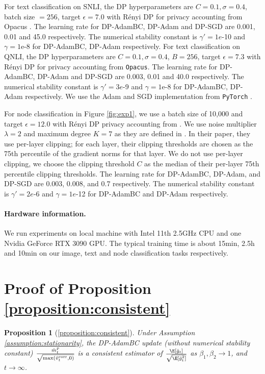 \documentclass[letterpaper]{article} %
\newtheorem*{proposition*}{Proposition}
\begin{document}
For text classification on SNLI, the DP hyperparameters are $C=0.1, \sigma=0.4$, batch size $=256$, target $\epsilon = 7.0$ with R\'enyi DP for privacy accounting from Opacus \citep{opacus}. The learning rate for DP-AdamBC, DP-Adam and DP-SGD are 0.001, 0.01 and 45.0 respectively. The numerical stability constant is $\gamma'=1e$-10 and $\gamma=1$e-8 for DP-AdamBC, DP-Adam respectively. For text classification on QNLI, the DP hyperparameters are $C=0.1, \sigma=0.4$, $B=256$, target $\epsilon = 7.3$ with R\'enyi DP for privacy accounting from \texttt{Opacus}. The learning rate for DP-AdamBC, DP-Adam and DP-SGD are 0.003, 0.01 and 40.0 respectively. The numerical stability constant is $\gamma'=3e$-9 and $\gamma=1$e-8 for DP-AdamBC, DP-Adam respectively. We use the Adam and SGD implementation from \texttt{PyTorch} \citep{pytorch}.

For node classification in Figure \ref{fig:exp1}, we use a batch size of 10,000 and target $\epsilon = 12.0$ with Rényi DP privacy accounting from \citet{daigavane2022nodelevel}. We use noise multiplier $\lambda = 2$ and maximum degree $K = 7$ as they are defined in \citet{daigavane2022nodelevel}. In their paper, they use per-layer clipping; for each layer, their clipping thresholds are chosen as the 75th percentile of the gradient norms for that layer. We do not use per-layer clipping, we choose the clipping threshold $C$ as the median of their per-layer 75th percentile clipping thresholds. The learning rate for DP-AdamBC, DP-Adam, and DP-SGD are 0.003, 0.008, and 0.7 respectively. The numerical stability constant is $\gamma' = 2e$-6 and $\gamma = 1e$-12 for DP-AdamBC and DP-Adam respectively.

\paragraph{Hardware information.} We run experiments on local machine with Intel 11th 2.5GHz CPU and one Nvidia GeForce RTX 3090 GPU. The typical training time is about 15min, 2.5h and 10min on our image, text and node classification tasks respectively.

\section{Proof of Proposition \ref{proposition:consistent}}
\label{apdix:consistent}

\begin{proposition*}[\ref{proposition:consistent}]
Under Assumption \ref{assumption:stationarity}, the DP-AdamBC update (without numerical stability constant) $\frac{\hat{m}_t^p}{\sqrt{\max(\hat{v}_t^{\textnormal{corr}}, 0)}}$ is a consistent estimator of $\frac{\E[\bar{g}_t]}{\sqrt{\E[\bar{g}_t^2]}}$ as $\beta_1, \beta_2 \rightarrow 1$, and $t \rightarrow \infty$.
\end{proposition*}
\end{document}
